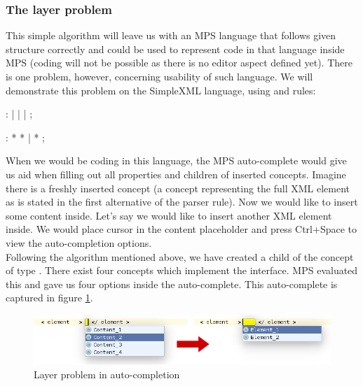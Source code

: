 \subsubsection{The layer problem}
\label{chap:layer_problem}

This simple algorithm will leave us with an MPS language that follows given structure correctly and could be used to represent code in that language inside MPS (coding will not be possible as there is no editor aspect defined yet). There is one problem, however, concerning usability of such language. We will demonstrate this problem on the SimpleXML language, using  and  rules:

\begin{antlr}
	    :   
           |   
           |   
           |   
           ;
	
	    :   \literal{<}  * \literal{>} * \literal{</}  \literal{>}
           |   \literal{<}  * \literal{/>}
           ;	
\end{antlr} 

When we would be coding in this language, the MPS auto-complete would give us aid when filling out all properties and children of inserted concepts. Imagine there is a freshly inserted  concept (a concept representing the full XML element as is stated in the first alternative of the  parser rule). Now we would like to insert some content inside. Let's say we would like to insert another XML element inside. We would place cursor in the content placeholder and press Ctrl+Space to view the auto-completion options.
\\

Following the algorithm mentioned above, we have created a child of the  concept of type . There exist four concepts which implement the  interface. MPS evaluated this and gave us four options inside the auto-complete. This auto-complete is captured in figure \ref{fig:layer_problem}.

\begin{figure}[h]
	\centering
	\includegraphics[width=\textwidth]{../img/layer_problem.png}
	\caption{Layer problem in auto-completion}
	\label{fig:layer_problem}
\end{figure}

